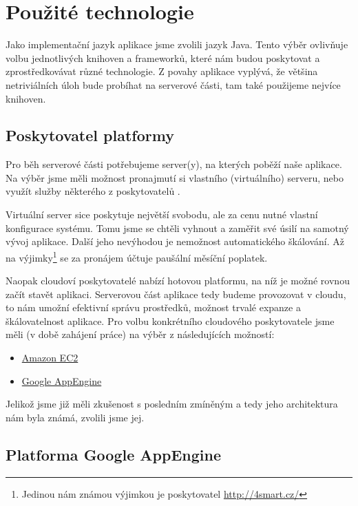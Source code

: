 \chapter{Použité technologie}

Jako implementační jazyk aplikace jsme zvolili jazyk Java.
Tento výběr ovlivňuje volbu jednotlivých knihoven a frameworků, které nám budou poskytovat a zprostředkovávat různé technologie.
Z povahy aplikace vyplývá, že většina netriviálních úloh bude probíhat na serverové části, tam také použijeme nejvíce knihoven.

\section{Poskytovatel platformy}
Pro běh serverové části potřebujeme server(y), na kterých poběží naše aplikace.
Na výběr jsme měli možnost pronajmutí si vlastního (virtuálního) serveru, nebo využít služby některého z poskytovatelů .

Virtuální server sice poskytuje největší svobodu, ale za cenu nutné vlastní konfigurace systému.
Tomu jsme se chtěli vyhnout a zaměřit své úsilí na samotný vývoj aplikace.
Další jeho nevýhodou je nemožnost automatického škálování.
Až na výjimky\footnote{Jedinou nám známou výjimkou je poskytovatel \url{http://4smart.cz/}} se za pronájem účtuje paušální měsíční poplatek.

Naopak cloudoví poskytovatelé nabízí hotovou platformu, na níž je možné rovnou začít stavět aplikaci.
Serverovou část aplikace tedy budeme provozovat v cloudu, to nám umožní efektivní správu prostředků, možnost trvalé expanze a škálovatelnost aplikace.
Pro volbu konkrétního cloudového poskytovatele jsme měli (v době zahájení práce) na výběr z následujících možností:
\begin{itemize}
	\item \href{http://aws.amazon.com/ec2/}{Amazon EC2}
	\item \href{http://appengine.google.com/}{Google AppEngine}
\end{itemize}

Jelikož jsme již měli zkušenost s posledním zmíněným a tedy jeho architektura nám byla známá, zvolili jsme jej.

\section{Platforma Google AppEngine}

